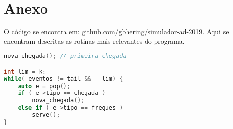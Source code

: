 \documentclass{article}
\begin{document}
\section{Anexo}

O código se encontra em: \url{github.com/gbhering/simulador-ad-2019}. Aqui se encontram descritas as rotinas mais relevantes do programa.

\begin{lstlisting}[language=C++, caption={Loop principal do programa}]
nova_chegada(); // primeira chegada

int lim = k;
while( eventos != tail && --lim) {
	auto e = pop();
	if ( e->tipo == chegada )
		nova_chegada();
	else if ( e->tipo == fregues )
		serve();
}
\end{lstlisting}
\end{document}
